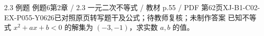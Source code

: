 \par\noindent\begin{minipage}{\linewidth}
\begin{bankitem}{2.3 例题 例题6}{第2章 / 2.3 一元二次不等式 / 教材 p.55 / PDF 第62页}{XJ-B1-C02-EX-P055-Y0626}{已对照原页转写题干及公式；待教师复核；未制作答案}
已知不等式 $x^2+ax+b<0$ 的解集为 $(-3,-1)$，求实数 $a,b$ 的值。
\end{bankitem}
\end{minipage}\par\medskip
